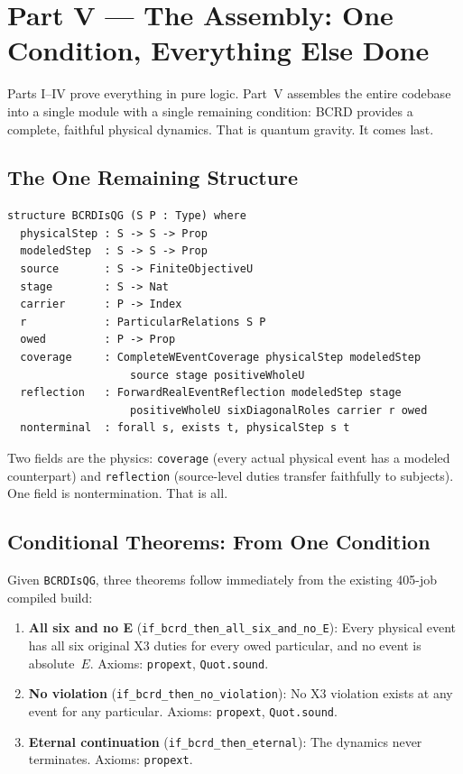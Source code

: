 \documentclass[12pt,a4paper]{article}
\begin{document}
\newpage
\section{Part V --- The Assembly: One Condition, Everything Else Done}
\label{sec:part5}

Parts I--IV prove everything in pure logic. Part~V assembles the
entire codebase into a single module with a single remaining condition:
BCRD provides a complete, faithful physical dynamics. That is quantum
gravity. It comes last.

\subsection{The One Remaining Structure}

\begin{lstlisting}
structure BCRDIsQG (S P : Type) where
  physicalStep : S -> S -> Prop
  modeledStep  : S -> S -> Prop
  source       : S -> FiniteObjectiveU
  stage        : S -> Nat
  carrier      : P -> Index
  r            : ParticularRelations S P
  owed         : P -> Prop
  coverage     : CompleteWEventCoverage physicalStep modeledStep
                   source stage positiveWholeU
  reflection   : ForwardRealEventReflection modeledStep stage
                   positiveWholeU sixDiagonalRoles carrier r owed
  nonterminal  : forall s, exists t, physicalStep s t
\end{lstlisting}

Two fields are the physics: \texttt{coverage} (every actual physical event has
a modeled counterpart) and \texttt{reflection} (source-level duties transfer
faithfully to subjects). One field is nontermination. That is all.

\subsection{Conditional Theorems: From One Condition}

Given \texttt{BCRDIsQG}, three theorems follow immediately from the existing
405-job compiled build:

\begin{enumerate}[nosep]
\item \textbf{All six and no E} (\texttt{if\_bcrd\_then\_all\_six\_and\_no\_E}):
  Every physical event has all six original X3 duties for every owed
  particular, and no event is absolute~$E$.
  Axioms: \texttt{propext}, \texttt{Quot.sound}.

\item \textbf{No violation} (\texttt{if\_bcrd\_then\_no\_violation}):
  No X3 violation exists at any event for any particular.
  Axioms: \texttt{propext}, \texttt{Quot.sound}.

\item \textbf{Eternal continuation} (\texttt{if\_bcrd\_then\_eternal}):
  The dynamics never terminates.
  Axioms: \texttt{propext}.
\end{enumerate}
\end{document}
